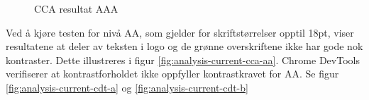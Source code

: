 \begin{figure}[H]
    \centering
    \caption{CCA resultat AAA}
    \label{fig:analysis-current-cca-aaa}
\end{figure}

Ved å kjøre testen  for nivå AA, som gjelder for skriftstørrelser opptil 18pt, viser resultatene at deler av teksten i logo og de grønne overskriftene ikke har gode nok kontraster. Dette illustreres i figur \ref{fig:analysis-current-cca-aa}. Chrome DevTools verifiserer at kontrastforholdet ikke oppfyller kontrastkravet for AA. Se figur \ref{fig:analysis-current-cdt-a} og \ref{fig:analysis-current-cdt-b}

